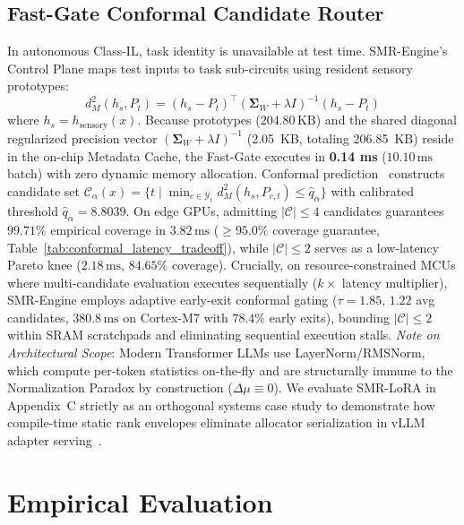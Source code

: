 \documentclass{article}
\begin{document}
\subsection{Fast-Gate Conformal Candidate Router}
In autonomous Class-IL, task identity is unavailable at test time. SMR-Engine's Control Plane maps test inputs to task sub-circuits using resident sensory prototypes:
\begin{equation}
\label{eq:mahalanobis_gate}
    d_M^2(h_s, P_t) = (h_s - P_t)^\top\!(\mathbf{\Sigma}_W + \lambda I)^{-1}\!(h_s - P_t)
\end{equation}
where $h_s = h_{\mathrm{sensory}}(x)$. Because prototypes ($204.80\,\text{KB}$) and the shared diagonal regularized precision vector $(\mathbf{\Sigma}_W + \lambda I)^{-1}$ (2.05~KB, totaling 206.85~KB) reside in the on-chip Metadata Cache, the Fast-Gate executes in \textbf{0.14 ms} ($10.10\,\text{ms}$ batch) with zero dynamic memory allocation. Conformal prediction~\cite{angelopoulos2021gentle} constructs candidate set $\mathcal{C}_\alpha(x) = \{t \mid \min_{c \in \mathcal{Y}_t} d_M^2(h_s, P_{c,t}) \le \hat{q}_\alpha\}$ with calibrated threshold $\hat{q}_\alpha = 8.8039$. On edge GPUs, admitting $|\mathcal{C}| \le 4$ candidates guarantees $99.71\%$ empirical coverage in $3.82\,\text{ms}$ ($\ge 95.0\%$ coverage guarantee, Table~\ref{tab:conformal_latency_tradeoff}), while $|\mathcal{C}| \le 2$ serves as a low-latency Pareto knee ($2.18\,\text{ms}$, $84.65\%$ coverage). Crucially, on resource-constrained MCUs where multi-candidate evaluation executes sequentially ($k\times$ latency multiplier), SMR-Engine employs adaptive early-exit conformal gating ($\tau=1.85$, $1.22$ avg candidates, $380.8\,\text{ms}$ on Cortex-M7 with $78.4\%$ early exits), bounding $|\mathcal{C}| \le 2$ within SRAM scratchpads and eliminating sequential execution stalls. \textit{Note on Architectural Scope}: Modern Transformer LLMs use LayerNorm/RMSNorm, which compute per-token statistics on-the-fly and are structurally immune to the Normalization Paradox by construction ($\Delta\mu \equiv 0$). We evaluate SMR-LoRA in Appendix~C strictly as an orthogonal systems case study to demonstrate how compile-time static rank envelopes eliminate allocator serialization in vLLM adapter serving~\cite{kwon2023efficient}.





\section{Empirical Evaluation}
\label{sec:experiments}
\end{document}
